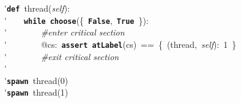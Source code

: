 \'\>\texttt{\textbf{def}}~thread(\textit{self}):\\

\'\>~~~~\texttt{\textbf{while}}~\texttt{\textbf{choose}}(\{~\texttt{\textbf{False}},~\texttt{\textbf{True}}~\}):\\

\'\>~~~~~~~~\emph{\#enter critical section}\\

\'\>~~~~~~~~@cs:~\texttt{\textbf{assert}}~\texttt{\textbf{atLabel}}(cs)~==~\{~(thread,~\textit{self}):~1~\}\\

\'\>~~~~~~~~\emph{\#exit critical section}\\

\'\>~~~~\\

\'\>\texttt{\textbf{spawn}}~thread(0)\\

\'\>\texttt{\textbf{spawn}}~thread(1)